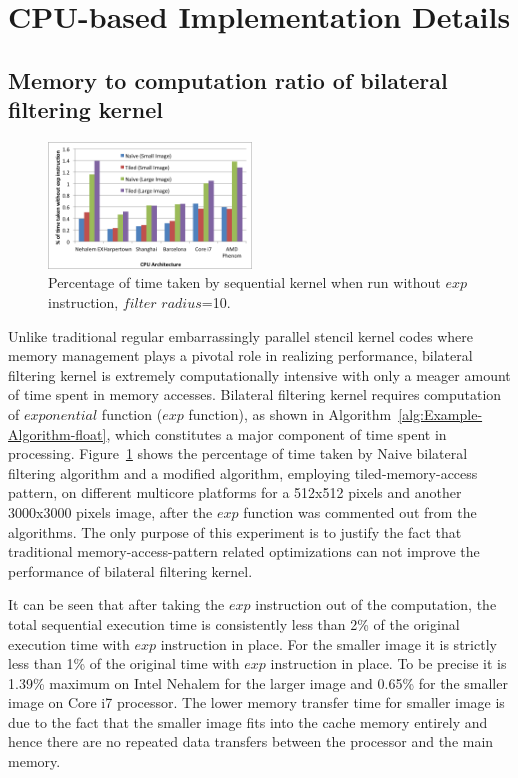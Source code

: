 \documentclass{IEEEtran}
\begin{document}
\section{CPU-based Implementation Details}
\label{sec:optimizations} 

\subsection{Memory to computation ratio of bilateral filtering kernel}
\begin{figure}[h!]
\begin{centering}
\includegraphics[width=0.48\textwidth]{images/noexplarge}
\end{centering}
\caption{Percentage of time taken by sequential kernel when run without $exp$ instruction, $filter$ $radius$=10.}
\label{fig:noexp} 
\end{figure}

Unlike traditional regular embarrassingly parallel stencil kernel codes where memory management plays a pivotal role in realizing performance, bilateral filtering kernel is extremely computationally intensive with only a meager amount of time spent in memory accesses. Bilateral filtering kernel requires computation of $exponential$ function ($exp$ function), as shown in Algorithm~\ref{alg:Example-Algorithm-float}, which constitutes a major component of time spent in processing. Figure~\ref{fig:noexp} shows the percentage of time taken by Naive bilateral filtering algorithm and a modified algorithm, employing tiled-memory-access pattern, on different multicore platforms for a 512x512 pixels and another 3000x3000 pixels image, after the $exp$ function was commented out from the algorithms. The only purpose of this experiment is to justify the fact that traditional memory-access-pattern related optimizations can not improve the performance of bilateral filtering kernel.

It can be seen that after taking the $exp$ instruction out of the computation, the total sequential execution time is consistently less than 2\% of the original execution time with $exp$ instruction in place. For the smaller image it is strictly less than 1\% of the original time with $exp$ instruction in place. To be precise it is 1.39\% maximum on Intel Nehalem for the larger image and 0.65\% for the smaller image on Core i7 processor. The lower memory transfer time for smaller image is due to the fact that the smaller image fits into the cache memory entirely and hence there are no repeated data transfers between the processor and the main memory.
\end{document}
